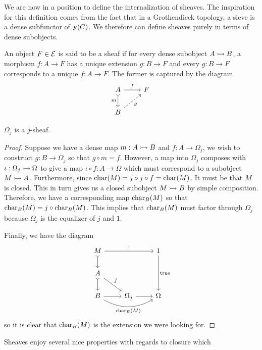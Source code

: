 We are now in a position to define the internalization of sheaves. The
inspiration for this definition comes from the fact that in a
Grothendieck topology, a sieve is a dense subfunctor of
$\mathbf{y}(C)$. We therefore can define sheaves purely in terms of dense
subobjects.

\begin{defn}\label{defn:background:sheaves}
  An object $F \in \mathcal{E}$ is said to be a sheaf if for every dense
  subobject $A \rightarrowtail B$, a morphism $f : A \to F$ has a unique
  extension $g : B \to F$ and every $g : B \to F$ corresponds to a
  unique $f : A \to F$. The former is captured by the diagram
  \[
    \begin{tikzcd}
      A \ar[d, rightarrowtail, swap, "m"] \ar[r, "f"] & F\\
      B \ar[ur, dashed, swap, "g"]
    \end{tikzcd}
  \]
\end{defn}
\begin{lem}\label{lem:background:omegajsheaf}
  $\Omega_j$ is a $j$-sheaf.
\end{lem}
\begin{proof}
  Suppose we have a dense map $m : A \rightarrowtail B$ and
  $f : A \to \Omega_j$, we wish to construct $g : B \to \Omega_j$ so
  that $g \circ m = f$. However, a map into $\Omega_j$ composes with
  $\iota : \Omega_j \rightarrowtail \Omega$ to give a map
  $\iota \circ f : A \to \Omega$ which must correspond to a subobject
  $M \rightarrowtail A$. Furthermore, since
  $\operatorname{char}(\bar{M}) = j \circ j \circ f = \operatorname{char}(M)$. It must be that $M$
  is closed. This in turn gives us a closed subobject $M \rightarrowtail B$ by
  simple composition. Therefore, we have a corresponding map
  $\operatorname{char}_B(M)$ so that $\operatorname{char}_B(M) = j \circ \operatorname{char}_B(M)$. This implies
  that $\operatorname{char}_B(M)$ must factor through $\Omega_j$ because $\Omega_j$
  is the equalizer of $j$ and $1$.

  Finally, we have the diagram
  \[
    \begin{tikzcd}
      M \ar[d, rightarrowtail] \ar[rr, "!"] & & 1 \ar[dd, "\true"]\\
      A \ar[d, rightarrowtail] \ar[dr, "f"] & & \\
      B \ar[r] \ar[rr, swap, bend right, "\charmap_B(M)"] & \Omega_j \ar[r] & \Omega
    \end{tikzcd}
  \]
  so it is clear that $\operatorname{char}_B(M)$ is the extension we were looking for.
\end{proof}
Sheaves enjoy several nice properties with regards to closure which
